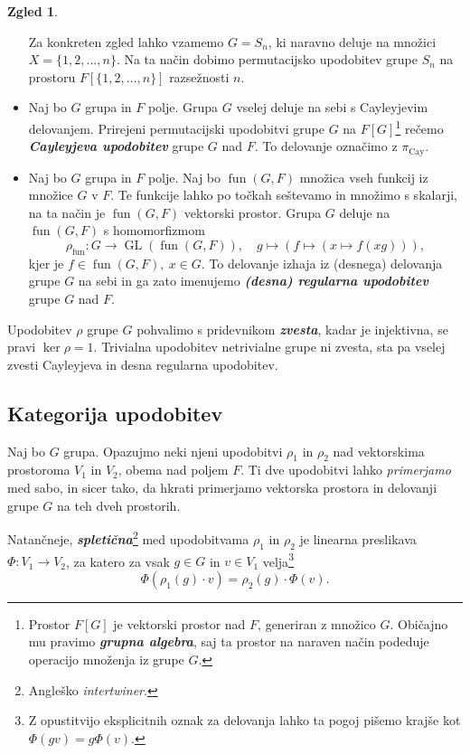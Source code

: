 \documentclass[11pt]{book}
\DeclareMathOperator\fun{fun}
\DeclareMathOperator\GL{GL}
\DeclareMathOperator\Cay{Cay}
\def\definicija{\color{rdeca}\bf\em}
\theoremstyle{definition}
\theoremstyle{zgled}
\newtheorem*{zgled}{Zgled}
\theoremstyle{odprtproblem}
\theoremstyle{domacanaloga}
\theoremstyle{izrek}
\begin{document}
\begin{zgled}
\begin{itemize}
        Za konkreten zgled lahko vzamemo $G = S_n$, ki naravno deluje na množici $X = \{ 1, 2, \dots, n \}$. Na ta način dobimo permutacijsko upodobitev grupe $S_n$ na prostoru $F[\{ 1, 2, \dots, n \}]$ razsežnosti $n$.
        \item Naj bo $G$ grupa in $F$ polje. Grupa $G$ vselej deluje na sebi s Cayleyjevim delovanjem. Prirejeni permutacijski upodobitvi grupe $G$ na $F[G]$\footnote{Prostor $F[G]$ je vektorski prostor nad $F$, generiran z množico $G$. Običajno mu pravimo {\definicija grupna algebra}, saj ta prostor na naraven način podeduje operacijo množenja iz grupe $G$.} rečemo {\definicija Cayleyjeva upodobitev} grupe $G$ nad $F$. To delovanje označimo z $\pi_{\Cay}$.
        \item Naj bo $G$ grupa in $F$ polje. Naj bo $\fun(G,F)$ množica vseh funkcij iz množice $G$ v $F$. Te funkcije lahko po točkah seštevamo in množimo s skalarji, na ta način je $\fun(G,F)$ vektorski prostor. Grupa $G$ deluje na $\fun(G,F)$ s homomorfizmom
        \[
            \rho_{\fun} \colon G \to \GL(\fun(G,F)), \quad
            g \mapsto \left( f \mapsto \left( x \mapsto f(xg) \right) \right),
        \]
        kjer je $f \in \fun(G,F), \ x \in G$. To delovanje izhaja iz (desnega) delovanja grupe $G$ na sebi in ga zato imenujemo {\definicija (desna) regularna upodobitev} grupe $G$ nad $F$.
    \end{itemize}
\end{zgled}

Upodobitev $\rho$ grupe $G$ pohvalimo s pridevnikom {\definicija zvesta}, kadar je injektivna, se pravi $\ker \rho = 1$. Trivialna upodobitev netrivialne grupe ni zvesta, sta pa vselej zvesti Cayleyjeva in desna regularna upodobitev.

\subsection{Kategorija upodobitev}

Naj bo $G$ grupa. Opazujmo neki njeni upodobitvi $\rho_1$ in $\rho_2$ nad vektorskima prostoroma $V_1$ in $V_2$, obema nad poljem $F$. Ti dve upodobitvi lahko \emph{primerjamo} med sabo, in sicer tako, da hkrati primerjamo vektorska prostora in delovanji grupe $G$ na teh dveh prostorih. 

Natančneje, {\definicija spletična}\footnote{Angleško \emph{intertwiner}.} med upodobitvama $\rho_1$ in $\rho_2$ je linearna preslikava $\Phi \colon V_1 \to V_2$, za katero za vsak $g \in G$ in $v \in V_1$ velja\footnote{Z opustitvijo eksplicitnih oznak za delovanja lahko ta pogoj pišemo krajše kot $\Phi(gv) = g\Phi(v)$.}
\[
  \Phi(\rho_1(g) \cdot v) = \rho_2(g) \cdot \Phi(v).
\]
\end{document}
